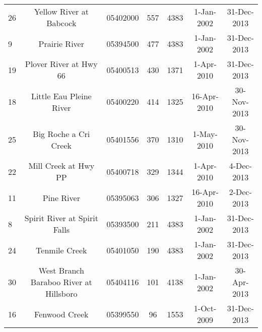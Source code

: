 \begin{table}[h]
\begin{tabular}{l c ccccc}
26	&	Yellow River at Babcock                & 05402000                    & 557                                     & 4383                              & 1-Jan-2002                     & 31-Dec-2013                  \\
9	&	Prairie River                          & 05394500                    & 477                                     & 4383                              & 1-Jan-2002                     & 31-Dec-2013                  \\
19	&	Plover River at Hwy 66                 & 05400513                    & 430                                     & 1371                              & 1-Apr-2010                     & 31-Dec-2013                  \\
18	&	Little Eau Pleine River                & 05400220                    & 414                                     & 1325                              & 16-Apr-2010                    & 30-Nov-2013                  \\
25	&	Big Roche a Cri Creek                  & 05401556                    & 370                                     & 1310                              & 1-May-2010                     & 30-Nov-2013                  \\
22	&	Mill  Creek at Hwy PP                  & 05400718                    & 329                                     & 1344                              & 1-Apr-2010                     & 4-Dec-2013                   \\
11	&	Pine River                             & 05395063                    & 306                                     & 1327                              & 16-Apr-2010                    & 2-Dec-2013                   \\
8	&	Spirit River at Spirit Falls           & 05393500                    & 211                                     & 4383                              & 1-Jan-2002                     & 31-Dec-2013                  \\
24	&	Tenmile Creek                          & 05401050                    & 190                                     & 4383                              & 1-Jan-2002                     & 31-Dec-2013                  \\
30	&	West Branch Baraboo River at Hillsboro & 05404116                    & 101                                     & 4138                              & 1-Jan-2002                     & 30-Apr-2013                  \\
16	&	Fenwood Creek                          & 05399550                    & 96                                      & 1553                              & 1-Oct-2009                     & 31-Dec-2013                  \\

\end{tabular}
\end{table}
